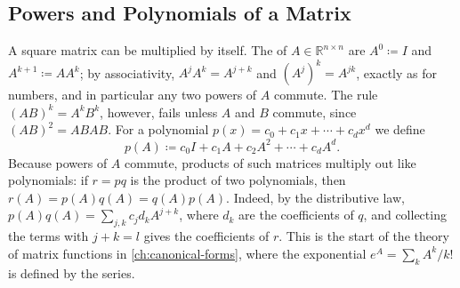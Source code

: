 \subsection{Powers and Polynomials of a Matrix}

A square matrix can be multiplied by itself. The  of $A\in\mathbb R^{n\times n}$ are $A^0\coloneqq I$ and $A^{k+1}\coloneqq AA^k$; by associativity, $A^jA^k=A^{j+k}$ and $(A^j)^k=A^{jk}$, exactly as for numbers, and in particular any two powers of $A$ commute. The rule $(AB)^k=A^kB^k$, however, fails unless $A$ and $B$ commute, since $(AB)^2=ABAB$. For a polynomial $p(x)=c_0+c_1x+\cdots+c_dx^d$ we define
\[
p(A)\coloneqq c_0I+c_1A+c_2A^2+\cdots+c_dA^d .
\]
Because powers of $A$ commute, products of such matrices multiply out like polynomials: if $r=pq$ is the product of two polynomials, then $r(A)=p(A)q(A)=q(A)p(A)$. Indeed, by the distributive law, $p(A)q(A)=\sum_{j,k}c_jd_kA^{j+k}$, where $d_k$ are the coefficients of $q$, and collecting the terms with $j+k=l$ gives the coefficients of $r$. This is the start of the theory of matrix functions in \cref{ch:canonical-forms}, where the exponential $e^A=\sum_kA^k/k!$ is defined by the series.

